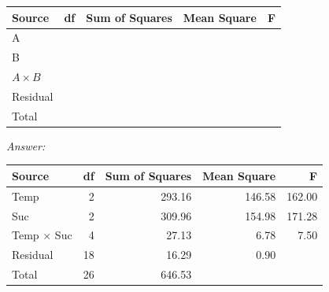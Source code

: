 \begin{enumerate}
\begin{table}[H]
	\renewcommand{\arraystretch}{1.5}
	\centering
	\begin{tabular}{lrrrr}
		\toprule
		Source & df & Sum of Squares & Mean Square & F\\
		\hline
		A & & & &\\
		B & & & &\\
		$A \times B$ & & & &\\
		Residual & & & &\\
		\hline
		Total & & & &\\
		\bottomrule
	\end{tabular}
\end{table}
{\it Answer: }\\
\begin{pf}
\begin{table}[H]
	\renewcommand{\arraystretch}{1.5}
	\centering
	\begin{tabular}{lrrrr}
		\toprule
		Source & df & Sum of Squares & Mean Square & F\\
		\hline
		Temp & 2 & 293.16 & 146.58 & 162.00\\
		Suc & 2 & 309.96 & 154.98 &171.28\\
		Temp $\times$ Suc & 4 & 27.13 & 6.78 &7.50\\
		Residual & 18 & 16.29 & 0.90 &\\
		\hline
		Total & 26 & 646.53 & &\\
		\bottomrule
	\end{tabular}
\end{table}	
\end{pf}
\end{enumerate}


















